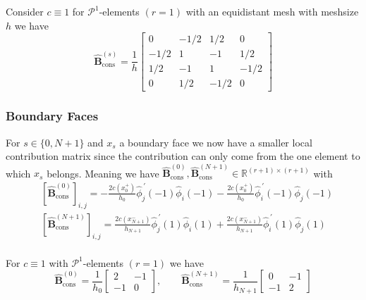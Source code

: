 \begin{example}
	Consider $c\equiv 1$ for $\mathcal{P}^1$-elements $(r=1)$
	with an equidistant mesh with meshsize $h$ we have
	\begin{equation*}
		\widehat{\textbf{B}}_{\text{cons}}^{(s)} = \frac{1}{h}
		\begin{bmatrix}
			0    & -1/2 & 1/2  & 0    \\
			-1/2 & 1    & -1   & 1/2  \\
			1/2  & -1   & 1    & -1/2 \\
			0    & 1/2  & -1/2 & 0
		\end{bmatrix}
	\end{equation*}
\end{example}

\subsubsection{Boundary Faces}
For $s\in \{0, N+1 \}$ and $x_s$ a boundary face we now have a smaller local contribution matrix
since the contribution can only come from the one element to which $x_s$ belongs. Meaning we have
$\widehat{\textbf{B}}_{\text{cons}}^{(0)}, \widehat{\textbf{B}}_{\text{cons}}^{(N+1)} \in \mathbb{R}^{(r+1)\times (r+1)}$
with
\begin{align*}
	 & [\widehat{\textbf{B}}_{\text{cons}}^{(0)}]_{i,j} =
	-\frac{2 c(x_0^+)}{h_{0}} \widehat{\phi}_j^{\,\prime}(-1) \widehat{\phi}_i(-1) - \frac{2 c(x_0^+)}{h_{0}} \widehat{\phi}_i^{\,\prime} (-1) \widehat{\phi}_j(-1)         \\
	 & [\widehat{\textbf{B}}_{\text{cons}}^{(N+1)}]_{i,j} =
	\frac{2 c(x_{N+1}^-)}{h_{N+1}} \widehat{\phi}_j^{\,\prime}(1) \widehat{\phi}_i(1) + \frac{ 2 c(x_{N+1}^-)}{h_{N+1}} \widehat{\phi}_i^{\,\prime} (1) \widehat{\phi}_j(1) \\
\end{align*}

\begin{example}
	For $c\equiv 1$ with $\mathcal{P}^1$-elements $(r=1)$ we have
	\begin{equation*}
		\widehat{\textbf{B}}_{\text{cons}}^{(0)} = \frac{1}{h_0}
		\begin{bmatrix}
			2  & -1 \\
			-1 & 0
		\end{bmatrix}
		,\qquad
		\widehat{\textbf{B}}_{\text{cons}}^{(N+1)} = \frac{1}{h_{N+1}}
		\begin{bmatrix}
			0  & -1 \\
			-1 & 2
		\end{bmatrix}
	\end{equation*}
\end{example}

